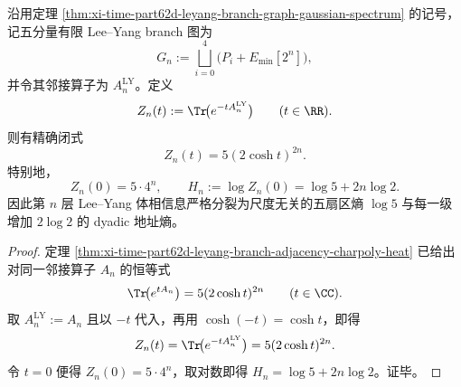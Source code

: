\begin{theorem}\label{thm:conclusion-leyang-five-hypercube-partition-splitting}
沿用定理 \ref{thm:xi-time-part62d-leyang-branch-graph-gaussian-spectrum} 的记号，记五分量有限 Lee--Yang branch 图为
\[
G_n:=\bigsqcup_{i=0}^{4}\bigl(P_i+E_{\min}[2^n]\bigr),
\]
并令其邻接算子为 \(A_n^{\mathrm{LY}}\)。定义
\[
Z_n(t):=\Tr\!\bigl(e^{-tA_n^{\mathrm{LY}}}\bigr)
\qquad (t\in\RR).
\]
则有精确闭式
\[
Z_n(t)=5(2\cosh t)^{2n}.
\]
特别地，
\[
Z_n(0)=5\cdot 4^n,
\qquad
H_n:=\log Z_n(0)=\log 5+2n\log 2.
\]
因此第 \(n\) 层 Lee--Yang 体相信息严格分裂为尺度无关的五扇区熵 \(\log 5\) 与每一级增加 \(2\log 2\) 的 dyadic 地址熵。
\end{theorem}
\begin{proof}
定理 \ref{thm:xi-time-part62d-leyang-branch-adjacency-charpoly-heat} 已给出对同一邻接算子 \(A_n\) 的恒等式
\[
\Tr\!\bigl(e^{tA_n}\bigr)=5(2\cosh t)^{2n}
\qquad (t\in\CC).
\]
取 \(A_n^{\mathrm{LY}}:=A_n\) 且以 \(-t\) 代入，再用 \(\cosh(-t)=\cosh t\)，即得
\[
Z_n(t)=\Tr\!\bigl(e^{-tA_n^{\mathrm{LY}}}\bigr)=5(2\cosh t)^{2n}.
\]
令 \(t=0\) 便得 \(Z_n(0)=5\cdot 4^n\)，取对数即得 \(H_n=\log 5+2n\log 2\)。证毕。
\end{proof}

